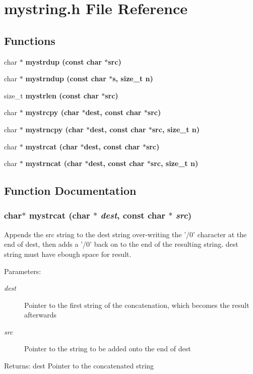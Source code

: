 \section{mystring.h File Reference}
\label{mystring_8h}
\subsection*{Functions}
\begin{CompactItemize}
\item 
char $\ast$ \bf{mystrdup} (const char $\ast$src)
\item 
char $\ast$ \bf{mystrndup} (const char $\ast$s, size\_\-t n)
\item 
size\_\-t \bf{mystrlen} (const char $\ast$src)
\item 
char $\ast$ \bf{mystrcpy} (char $\ast$dest, const char $\ast$src)
\item 
char $\ast$ \bf{mystrncpy} (char $\ast$dest, const char $\ast$src, size\_\-t n)
\item 
char $\ast$ \bf{mystrcat} (char $\ast$dest, const char $\ast$src)
\item 
char $\ast$ \bf{mystrncat} (char $\ast$dest, const char $\ast$src, size\_\-t n)
\end{CompactItemize}


\subsection{Function Documentation}
\subsubsection{\setlength{\rightskip}{0pt plus 5cm}char$\ast$ mystrcat (char $\ast$ {\em dest}, const char $\ast$ {\em src})}\label{mystring_8h_ebc286ca79fc1f0b7ca5d05066cd79a7}


Appends the src string to the dest string over-writing the '/0' character at the end of dest, then adds a '/0' back on to the end of the resulting string. dest string must have ebough space for result. \begin{Desc}
\item[Parameters:]
\begin{description}
\item[{\em dest}]Pointer to the first string of the concatenation, which becomes the result afterwards \item[{\em src}]Pointer to the string to be added onto the end of dest \end{description}
\end{Desc}
\begin{Desc}
\item[Returns:]dest Pointer to the concatenated string \end{Desc}
